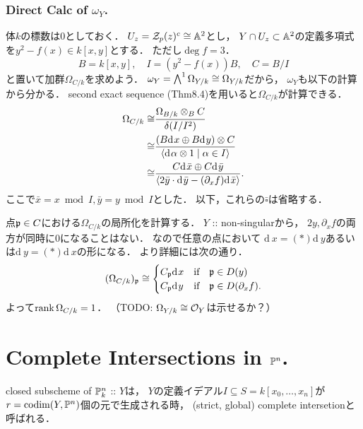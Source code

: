 \documentclass[a4paper]{jsarticle}
\newcommand{\der}[1][\!]{\mathrm{d}_{#1}\,}
\newcommand{\Der}{\Omega}
\newcommand{\shCano}{\omega}
\begin{document}
    \subsubsection{Direct Calc of $\shCano_Y$.}
    体$k$の標数は$0$としておく．
    $U_z=\mathcal{Z}_p(z)^c \cong \mathbb{A}^2$とし，
    $Y \cap U_z \subset \mathbb{A}^2$の定義多項式を$y^2-f(x) \in k[x,y]$とする．
    ただし$\deg f=3$．
    \[ B=k[x,y], \quad I=(y^2-f(x))B, \quad C=B/I \]
    と置いて加群$\Der_{C/k}$を求めよう．
    $\shCano_Y=\bigwedge^1 \Der_{Y/k} \iso \Der_{Y/k}$だから，
    $\shCano_Y$も以下の計算から分かる．
    second exact sequence (Thm8.4)を用いると$\Der_{C/k}$が計算できる．
    \begin{align*}
                \Der_{C/k}
        \iso&   \frac{\Der_{B/k} \otimes_B C}{\delta(I/I^2)} \\
        \iso&   \frac{(B \der x \oplus B \der y) \otimes C}
                {\langle \der \alpha \otimes 1 \mid \alpha \in I \rangle} \\
        \iso&   \frac{C \der \bar{x} \oplus C \der \bar{y}}
                {\langle 2 \bar{y} \cdot \der \bar{y} -(\partial_x f) \der \bar{x} \rangle}.
    \end{align*}
    ここで$\bar{x}=x \bmod I, \bar{y}=y \bmod I$とした．
    以下，これらの$\bar{\square}$は省略する．
    
    点$\mathfrak{p} \in C$における$\Der_{C/k}$の局所化を計算する．
    $Y$ :: non-singularから，
    $2y, \partial_x f$の両方が同時に$0$になることはない．
    なので任意の点において
    $\der x=(*) \der y$あるいは$\der y=(*) \der x$の形になる．
    より詳細には次の通り．
    \[
        (\Der_{C/k})_{\I{p}} \iso
        \begin{cases}{}
            C_{\I{p}} \der x & \text{if} \quad \I{p} \in D(y) \\
            C_{\I{p}} \der y & \text{if} \quad \I{p} \in D(\partial_x f). \\
        \end{cases}
    \]
    よって$\rank \Der_{C/k}=1$．
    （TODO: $\Der_{Y/k} \iso \shO_Y$は示せるか？）

\section{Complete Intersections in $\mathbb{P}^n$.} %
    \begin{Def}
        closed subscheme of $\mathbb{P}^n_k$ :: $Y$は，
        $Y$の定義イデアル$I \subseteq S=k[x_0,\dots,x_n]$が
        $r=\operatorname{codim} (Y, \mathbb{P}^n)$個の元で生成される時，
        (strict, global) complete intersetionと呼ばれる．
    \end{Def}
\end{document}
